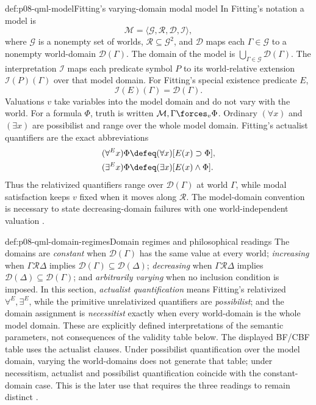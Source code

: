\begin{hbdefinition}{def:p08-qml-model}{Fitting's varying-domain modal model}
In Fitting's notation a model is
\[
 \mathcal M=\langle\mathcal G,\mathcal R,\mathcal D,\mathcal I\rangle,
\]
where \(\mathcal G\) is a nonempty set of worlds,
\(\mathcal R\subseteq\mathcal G^2\), and
\(\mathcal D\) maps each \(\Gamma\in\mathcal G\) to a nonempty world-domain
\(\mathcal D(\Gamma)\).  The domain of the model is
\(\bigcup_{\Gamma\in\mathcal G}\mathcal D(\Gamma)\).  The interpretation
\(\mathcal I\) maps each predicate symbol \(P\) to its world-relative
extension \(\mathcal I(P)(\Gamma)\) over that model domain.  For Fitting's
special existence predicate \(E\),
\[
 \mathcal I(E)(\Gamma)=\mathcal D(\Gamma).
\]
Valuations \(v\) take variables into the model domain and do not vary with the
world.  For a formula \(\Phi\), truth is written
\(\mathcal M,\Gamma\forces_v\Phi\).  Ordinary
\((\forall x)\) and \((\exists x)\) are possibilist and range over the whole
model domain.  Fitting's actualist quantifiers are the exact abbreviations
\[
\begin{aligned}
 (\forall^{E}x)\Phi
 &\defeq (\forall x)[E(x)\supset\Phi],\\
 (\exists^{E}x)\Phi
 &\defeq (\exists x)[E(x)\land\Phi].
\end{aligned}
\]
Thus the relativized quantifiers range over \(\mathcal D(\Gamma)\) at world
\(\Gamma\), while modal satisfaction keeps \(v\) fixed when it moves along
\(\mathcal R\).  The model-domain convention is necessary to state
decreasing-domain failures with one world-independent valuation
\cite{Fitting2002Alethic,FittingMendelsohn1998}.
\end{hbdefinition}

\begin{hbdefinition}{def:p08-qml-domain-regimes}{Domain regimes and philosophical readings}
The domains are \emph{constant} when \(\mathcal D(\Gamma)\) has the same
value at every world; \emph{increasing} when
\(\Gamma\mathcal R\Delta\) implies
\(\mathcal D(\Gamma)\subseteq\mathcal D(\Delta)\);
\emph{decreasing} when \(\Gamma\mathcal R\Delta\) implies
\(\mathcal D(\Delta)\subseteq\mathcal D(\Gamma)\); and
\emph{arbitrarily varying} when no inclusion condition is imposed.  In this
section, \emph{actualist quantification} means Fitting's relativized
\(\forall^E,\exists^E\), while the primitive unrelativized quantifiers are
\emph{possibilist}; and the domain assignment is \emph{necessitist} exactly
when every world-domain is the whole model domain.  These are explicitly defined
interpretations of the semantic parameters, not consequences of the validity
table below.  The displayed BF/CBF table uses the actualist clauses.  Under
possibilist quantification over the model domain, varying the world-domains does not
generate that table; under necessitism, actualist and possibilist
quantification coincide with the constant-domain case.  This is the later use
that requires the three readings to remain distinct \cite{Williamson2013}.
\end{hbdefinition}


